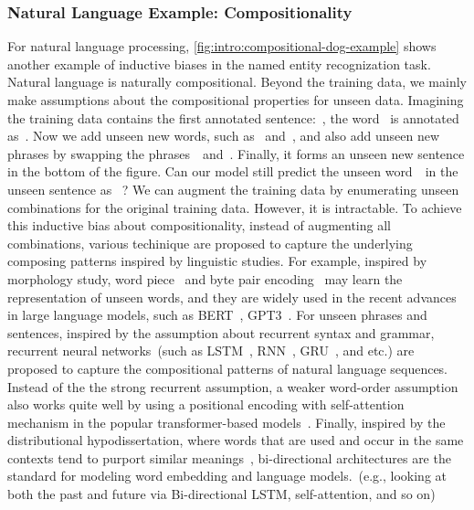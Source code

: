 \subsubsection{Natural Language Example: Compositionality}
\label{sssec:intro:nlp-example}

For natural language processing,
\autoref{fig:intro:compositional-dog-example} shows another example of
inductive biases in the named entity recognization task. Natural
language is naturally compositional. Beyond the training data, we
mainly make assumptions about the compositional properties for unseen
data. Imagining the training data contains the first annotated
sentence:~, the word~ is annotated as~. Now
we add unseen new words, such as~ and~,
and also add unseen new phrases by swapping the phrases~~and~. Finally, it forms an unseen new
sentence in the bottom of the figure. Can our model still predict the
unseen word~~in the unseen sentence as
~? We can augment the training data by enumerating
unseen combinations for the original training data. However, it is
intractable. To achieve this inductive bias about compositionality,
instead of augmenting all combinations, various techinique are
proposed to capture the underlying composing patterns inspired by
linguistic studies. For example, inspired by morphology study, word
piece~\citep{schuster2012japanese} and byte pair
encoding~\citep[BPE,][]{sennrich2016neural} may learn the
representation of unseen words, and they are widely used in the recent
advances in large language models, such as
BERT~\citep{devlin2019bert}, GPT3~\citep{brown2020language}. For
unseen phrases and sentences, inspired by the assumption about
recurrent syntax and grammar, recurrent neural networks~(such as
LSTM~\citep{hochreiter97lstm}, RNN~\citep{mesnil13rnn},
GRU~\citep{chung14gru}, and etc.)  are proposed to capture the
compositional patterns of natural language sequences. Instead of the
the strong recurrent assumption, a weaker word-order assumption also
works quite well by using a positional encoding with self-attention
mechanism in the popular transformer-based
models~\citep{NIPS2017_7181}. Finally, inspired by the distributional
hypodissertation, where words that are used and occur in the same contexts
tend to purport similar meanings~\cite{harris1954distributional},
bi-directional architectures are the standard for modeling word
embedding and language models.~(e.g., looking at both the past and
future via Bi-directional LSTM, self-attention, and so on)


